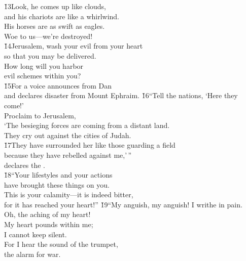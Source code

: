 \begin{poetry}
\poeml \v{13}Look, he comes up like clouds, \\
\poemll    and his chariots are like a whirlwind. \\
\poeml His horses are as swift as eagles. \\
\poemll    Woe to us---we're destroyed! \\
\poeml \v{14}Jerusalem, wash your evil from your heart \\
\poemll    so that you may be delivered. \\
\poeml How long will you harbor \\
\poemll    evil schemes within you? \\
\poeml \v{15}For a voice announces from Dan \\
\poemll    and declares disaster from Mount Ephraim.
\poeml \v{16}``Tell the nations, `Here they come!' \\
\poemll    Proclaim to Jerusalem, \\
\poeml `The besieging forces are coming from a distant land. \\
\poemll    They cry out against the cities of Judah. \\
\poeml \v{17}They have surrounded her like those guarding a field \\
\poemll    because they have rebelled against me,'\,'' \\
\poemlll       declares the . \\
\poeml \v{18}``Your lifestyles and your actions \\
\poemll    have brought these things on you. \\
\poeml This is your calamity---it is indeed bitter, \\
\poemll    for it has reached your heart!''
\poeml \v{19}``My anguish, my anguish! I writhe in pain. \\
\poemll    Oh, the aching of my heart! \\
\poeml My heart pounds within me; \\
\poemll    I cannot keep silent. \\
\poeml For I hear the sound of the trumpet, \\
\poemll    the alarm for war. \\

\end{poetry}

